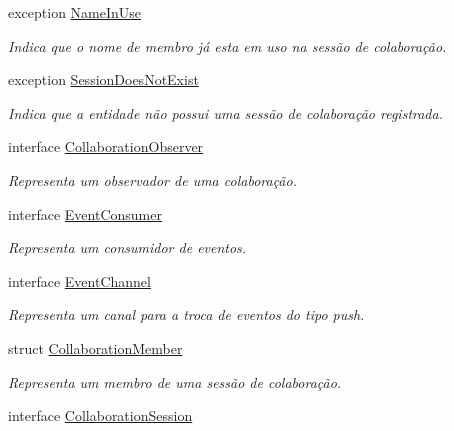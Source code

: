 \begin{DoxyCompactItemize}
\item 
exception \hyperlink{exceptiontecgraf_1_1openbus_1_1services_1_1collaboration_1_1v1__0_1_1NameInUse}{\-Name\-In\-Use}
\begin{DoxyCompactList}\small\item\em \-Indica que o nome de membro já esta em uso na sessão de colaboração. \end{DoxyCompactList}\item 
exception \hyperlink{exceptiontecgraf_1_1openbus_1_1services_1_1collaboration_1_1v1__0_1_1SessionDoesNotExist}{\-Session\-Does\-Not\-Exist}
\begin{DoxyCompactList}\small\item\em \-Indica que a entidade não possui uma sessão de colaboração registrada. \end{DoxyCompactList}\item 
interface \hyperlink{interfacetecgraf_1_1openbus_1_1services_1_1collaboration_1_1v1__0_1_1CollaborationObserver}{\-Collaboration\-Observer}
\begin{DoxyCompactList}\small\item\em \-Representa um observador de uma colaboração. \end{DoxyCompactList}\item 
interface \hyperlink{interfacetecgraf_1_1openbus_1_1services_1_1collaboration_1_1v1__0_1_1EventConsumer}{\-Event\-Consumer}
\begin{DoxyCompactList}\small\item\em \-Representa um consumidor de eventos. \end{DoxyCompactList}\item 
interface \hyperlink{interfacetecgraf_1_1openbus_1_1services_1_1collaboration_1_1v1__0_1_1EventChannel}{\-Event\-Channel}
\begin{DoxyCompactList}\small\item\em \-Representa um canal para a troca de eventos do tipo push. \end{DoxyCompactList}\item 
struct \hyperlink{structtecgraf_1_1openbus_1_1services_1_1collaboration_1_1v1__0_1_1CollaborationMember}{\-Collaboration\-Member}
\begin{DoxyCompactList}\small\item\em \-Representa um membro de uma sessão de colaboração. \end{DoxyCompactList}\item 
interface \hyperlink{interfacetecgraf_1_1openbus_1_1services_1_1collaboration_1_1v1__0_1_1CollaborationSession}{\-Collaboration\-Session}

\end{DoxyCompactItemize}
